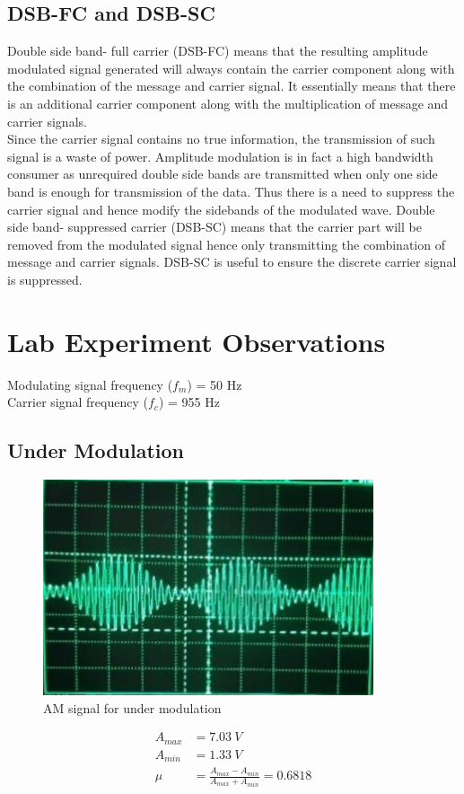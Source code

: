 \documentclass{lab_sheet}
\begin{document}
    \subsection{DSB-FC and DSB-SC}
    Double side band- full carrier (DSB-FC) means that the resulting amplitude modulated signal generated will always contain the carrier component along with the combination of the message and carrier signal. It essentially means that there is an additional carrier component along with the multiplication of message and carrier signals.\\
    Since the carrier signal contains no true information, the transmission of such signal is a waste of power. Amplitude modulation is in fact a high bandwidth consumer as unrequired double side bands are transmitted when only one side band is enough for transmission of the data. Thus there is a need to suppress the carrier signal and hence modify the sidebands of the modulated wave. Double side band- suppressed carrier (DSB-SC) means that the carrier part will be removed from the modulated signal hence only transmitting the combination of message and carrier signals. DSB-SC is useful to ensure the discrete carrier signal is suppressed. 
    \section{Lab Experiment Observations}
    Modulating signal frequency ($f_m$) = 50 Hz\\
    Carrier signal frequency ($f_c$) = 955 Hz 
    
    \subsection*{Under Modulation}
    \begin{figure}[H]
     \centering
            \includegraphics[scale=0.8]{Figures/dsb_fc_under.png}
        \caption{AM signal for under modulation}
      \end{figure}
      \begin{align*}
       A_{max}&=7.03~V\\
       A_{min}&=1.33~V\\
       \mu&=\frac{A_{max}-A_{min}}{A_{max}+A_{min}}=0.6818
      \end{align*}
\end{document}
